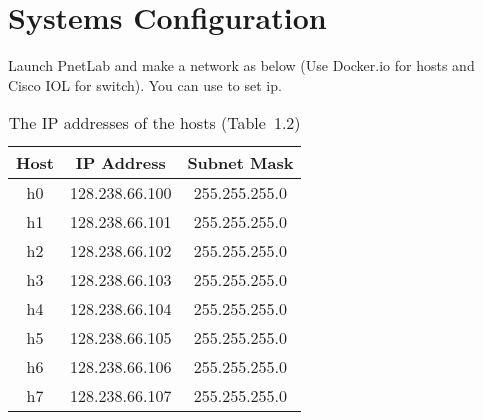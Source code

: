 \documentclass{../UTNetLab}
\begin{document}
\section*{Systems Configuration}
Launch PnetLab and make a network as below (Use Docker.io for hosts and Cisco IOL for switch).
You can use  to set ip.
\begin{center}
    \begin{minipage}{0.48\textwidth}
        \begin{flushleft}
            \begin{table}[H]
                \caption{The IP addresses of the hosts (Table~1.2)}
                \centering
                \begin{tabular}{ c c c }
                    \hline \hline
                    Host & IP Address     & Subnet Mask   \\
                    \hline
                    h0   & 128.238.66.100 & 255.255.255.0 \\
                    h1   & 128.238.66.101 & 255.255.255.0 \\
                    h2   & 128.238.66.102 & 255.255.255.0 \\
                    h3   & 128.238.66.103 & 255.255.255.0 \\
                    h4   & 128.238.66.104 & 255.255.255.0 \\
                    h5   & 128.238.66.105 & 255.255.255.0 \\
                    h6   & 128.238.66.106 & 255.255.255.0 \\
                    h7   & 128.238.66.107 & 255.255.255.0 \\
                    \hline \hline
                \end{tabular}
            \end{table}
        \end{flushleft}
    \end{minipage}
    \begin{minipage}{0.48\textwidth}
        \begin{flushright}
            \begin{figure}[H]
                \centering
\end{figure}
\end{flushright}
\end{minipage}
\end{center}
\end{document}
